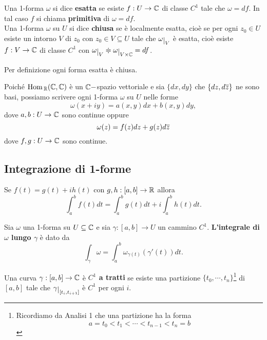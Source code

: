 \begin{multicols*}{2}
\begin{definition}
Una 1-forma $\omega$ si dice \textbf{esatta} se esiste $f:U\to \mathbb{C}$ di classe $C^1$ tale che $\omega=df$. In tal caso $f$ si chiama \textbf{primitiva} di $\omega=df$.\\
Una 1-forma $\omega$ su $U$ si dice \textbf{chiusa} se \`e localmente esatta, cio\`e se per ogni $z_0\in U$ esiste un intorno $V$ di $z_0$ con $z_0\in V\subseteq U$ tale che $\omega\res V$ \`e esatta, cio\`e esiste $f:V\to \mathbb{C}$ di classe $C^1$ con $\omega\res V\doteqdot \omega\res{V\times \C}=df$.
\end{definition}
\begin{remark}
Per definizione ogni forma esatta \`e chiusa.
\end{remark}

\begin{remark}
Poich\'e $\mathrm{Hom}\,_{\mathbb{R}}(\mathbb{C},\mathbb{C})$ \`e un $\mathbb{C}-$spazio vettoriale e sia $\{dx,dy\}$ che $\{dz,d\overline{z}\}$ ne sono basi, possiamo scrivere ogni 1-forma $\omega$ su $U$ nelle forme
\[\omega(x+iy)=a(x,y)dx+b(x,y)dy,\]
dove $a,b:U\to \mathbb{C}$ sono continue oppure
\[\omega(z)=f(z)dz+g(z)d\overline{z}\]
dove $f,g:U\to \mathbb{C}$ sono continue.
\end{remark}

\subsection{Integrazione di 1-forme}
\begin{definition}
Se $f(t)=g(t)+ih(t)$ con $g,h:[a,b]\to \mathbb{R}$ allora
\[\int_a^bf(t)dt=\int_a^bg(t)dt+i\int_a^bh(t)dt.\]
\end{definition}

\begin{definition}
Sia $\omega$ una 1-forma su $U\subseteq \mathbb{C}$ e sia $\gamma:[a,b]\to U$ un cammino $C^1$. \textbf{L'integrale di $\omega$ lungo $\gamma$} \`e dato da
\[\int_\gamma\omega=\int_a^b\omega_{\gamma(t)}(\gamma'(t))dt.\]
\end{definition}

\begin{definition}
Una curva $\gamma:[a,b]\to \mathbb{C}$ \`e \textbf{$C^1$ a tratti} se esiste una partizione $\{t_0,\cdots, t_n\}$\footnote{Ricordiamo da Analisi 1 che una partizione ha la forma
\[a=t_0<t_1<\cdots<t_{n-1}<t_n=b\]
} di $[a,b]$ tale che $\gamma\res{\spa{t_i,t_{i+1}}}$ \`e $C^1$ per ogni $i$.
\end{definition}


\end{multicols*}
